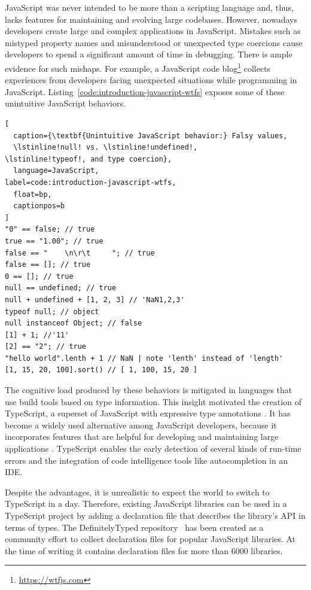 \documentclass[sigplan,screen]{acmart}
\newcommand{\coderef}[1]{Listing~\ref{#1}}
\begin{document}
JavaScript was never intended to be more than a
scripting language and, thus, lacks features for maintaining and evolving large
codebases. However, nowadays developers create large and complex
applications in JavaScript. 
Mistakes such as mistyped property
names and misunderstood or unexpected type coercions cause developers
to spend a significant amount of time in debugging. There is ample
evidence for such mishaps. For example, a 
JavaScript code blog\footnote{\url{https://wtfjs.com}} collects experiences
from developers facing unexpected situations while programming in
JavaScript. \coderef{code:introduction-javascript-wtfs} exposes some
of these unintuitive JavaScript behaviors. 

\begin{lstlisting}[
  caption={\textbf{Unintuitive JavaScript behavior:} Falsy values,
  \lstinline!null! vs. \lstinline!undefined!,
\lstinline!typeof!, and type coercion},
  language=JavaScript,
label=code:introduction-javascript-wtfs,
  float=bp,
  captionpos=b
]
"0" == false; // true
true == "1.00"; // true
false == "    \n\r\t     "; // true
false == []; // true
0 == []; // true
null == undefined; // true
null + undefined + [1, 2, 3] // 'NaN1,2,3' 
typeof null; // object
null instanceof Object; // false
[1] + 1; //'11'
[2] == "2"; // true
"hello world".lenth + 1 // NaN | note 'lenth' instead of 'length'
[1, 15, 20, 100].sort() // [ 1, 100, 15, 20 ]
\end{lstlisting}

The cognitive load produced by these behaviors is mitigated in languages that use
build tools based on type information. This insight motivated the
creation of TypeScript, a superset of JavaScript with expressive type
annotations \cite{typescript}. It has become a widely used alternative
among JavaScript developers, because it incorporates features that are
helpful for developing and maintaining large applications
\cite{DBLP:conf/icse/GaoBB17}. TypeScript enables the early detection
of several kinds of run-time errors and the integration of code intelligence
tools like autocompletion in an IDE.

Despite the advantages, it is unrealistic to expect the world to
switch to TypeScript in a day. Therefore, 
existing JavaScript libraries can be used in a TypeScript project by
adding a declaration file that describes the library's
API in terms of types. 
The DefinitelyTyped repository~\cite{definitely-typed-repository} has
been created as a community effort to collect declaration files for
popular JavaScript libraries. At the time of writing it contains
declaration files for more than 6000 libraries.
\end{document}
